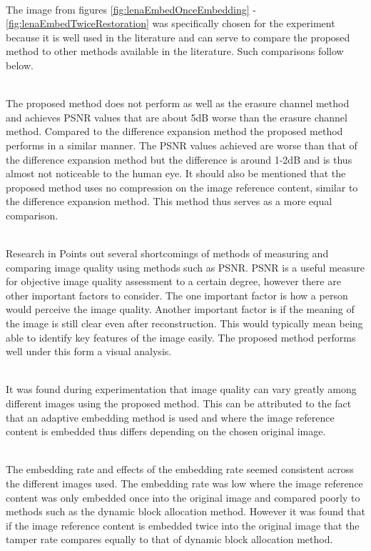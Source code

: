 \documentclass[12pt]{article}
\begin{document}
\hspace{0pt} \\
The image from figures \ref{fig:lenaEmbedOnceEmbedding} - \ref{fig:lenaEmbedTwiceRestoration} was specifically chosen for the experiment because it is well used in the literature and can serve to compare the proposed method to other methods available in the literature.
Such comparisons follow below. 

\hspace{0pt} \\
The proposed method does not perform as well as the erasure channel method and achieves PSNR values that are about 5dB worse than the erasure channel method.
Compared to the difference expansion method the proposed method performs in a similar manner.
The PSNR values achieved are worse than that of the difference expansion method but the difference is around 1-2dB and is thus almost not noticeable to the human eye.
It should also be mentioned that the proposed method uses no compression on the image reference content, similar to the difference expansion method.
This method thus serves as a more equal comparison. 

\hspace{0pt} \\
Research in \cite{wang2002image} Points out several shortcomings of methods of measuring and comparing image quality using methods such as PSNR. 
PSNR is a useful measure for objective image quality assessment to a certain degree, however there are other important factors to consider. 
The one important factor is how a person would perceive the image quality.
Another important factor is if the meaning of the image is still clear even after reconstruction.
This would typically mean being able to identify key features of the image easily. 
The proposed method performs well under this form a visual analysis.

\hspace{0pt} \\
It was found during experimentation that image quality can vary greatly among different images using the proposed method.
This can be attributed to the fact that an adaptive embedding method is used and where the image reference content is embedded thus differs depending on the chosen original image.

\hspace{0pt} \\
The embedding rate and effects of the embedding rate seemed consistent across the different images used.
The embedding rate was low where the image reference content was only embedded once into the original image and compared poorly to methods such as the dynamic block allocation method.
However it was found that if the image reference content is embedded twice into the original image that the tamper rate compares equally to that of dynamic block allocation method.
\end{document}
